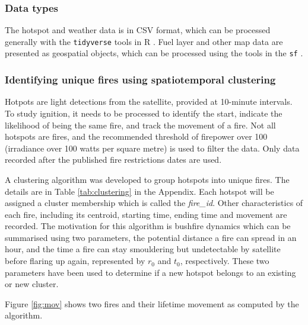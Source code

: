 \documentclass[11pt,a4paper,]{article}
\begin{document}
\hypertarget{data-types}{%
\subsubsection{Data types}\label{data-types}}

The hotspot and weather data is in CSV format, which can be processed generally with the \texttt{tidyverse} \autocite{R-tidyverse} tools in R \autocite{R}. Fuel layer and other map data are presented as geospatial objects, which can be processed using the tools in the \texttt{sf} \autocite{R-sf}.

\hypertarget{identifying-unique-fires-using-spatiotemporal-clustering}{%
\subsubsection{Identifying unique fires using spatiotemporal clustering}\label{identifying-unique-fires-using-spatiotemporal-clustering}}

Hotpots are light detections from the satellite, provided at 10-minute intervals. To study ignition, it needs to be processed to identify the start, indicate the likelihood of being the same fire, and track the movement of a fire. Not all hotspots are fires, and the recommended threshold of firepower over 100 (irradiance over 100 watts per square metre) is used to filter the data. Only data recorded after the published fire restrictions dates are used.

A clustering algorithm was developed to group hotspots into unique fires. The details are in Table \ref{tab:clustering} in the Appendix. Each hotspot will be assigned a cluster membership which is called the \emph{fire\_id}. Other characteristics of each fire, including its centroid, starting time, ending time and movement are recorded. The motivation for this algorithm is bushfire dynamics which can be summarised using two parameters, the potential distance a fire can spread in an hour, and the time a fire can stay smouldering but undetectable by satellite before flaring up again, represented by \(r_0\) and \(t_0\), respectively. These two parameters have been used to determine if a new hotspot belongs to an existing or new cluster.

Figure \ref{fig:mov} shows two fires and their lifetime movement as computed by the algorithm.
\end{document}
